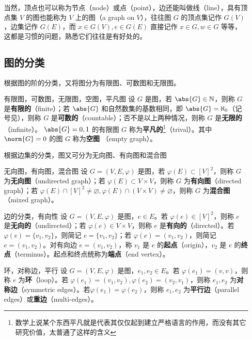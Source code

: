 当然，顶点也可以称为节点（node）或点（point），边还能叫做线（line），具有顶点集 $V$ 的图也能称为 $V$ 上的图（a graph on $V$），往往图 $G$ 的顶点集记作 $G(V)$，边集记作 $G(E)$，而 $x\in G(V),e\in G(E)$ 直接记作 $x\in G,w\in G$ 等等，这都是习惯的问题，熟悉它们往往是有好处的。


\subsection{图的分类}
根据图的阶的分类，又将图分为有限图、可数图和无限图。
\begin{definition}{有限图，可数图，无限图，空图，平凡图}
设 $G$ 是图，若 $\abs{G}\in\mathbb N$，则称 $G$ 是\textbf{有限的}（finite）；若 $\abs{G}$ 和自然数集的基数相同，即 $\abs{G}=\aleph_0$（记号见），则称 $G$ 是\textbf{可数的}（countable）；否不是以上两种情况，则称 $G$ 是\textbf{无限的}（infinite）。 $\abs{G}=0,1$ 的有限图 $G$ 称为\textbf{平凡的}\footnote{数学上说某个东西平凡就是代表其仅仅起到建立严格语言的作用，而没有其它研究价值，太普通了这样的含义}（trival）。其中 $\norm{G}=0$ 的图 $G$ 称为\textbf{空图} （empty graph）。 
\end{definition}

根据边集的分类，图又可分为无向图、有向图和混合图
\begin{definition}{无向图，有向图，混合图}
设 $G=(V,E,\varphi)$ 是图，若 $\varphi(E)\subset[V]^2$，则称 $G$ 为\textbf{无向图}（undirected graph）；若 $\varphi(E)\subset V\times V$，则称 $G$ 为\textbf{有向图}（directed graph）；若 $\varphi(E)\cap[V]^2\neq\varnothing,\varphi(E)\cap (V\times V)\neq\varnothing$，则称 $G$ 为\textbf{混合图}（mixed graph）。
\end{definition}

\begin{definition}{边的分类，有向性}
设 $G=(V,E,\varphi)$ 是图，$e\in E$。若 $\varphi(e)\in[V]^2$，则称 $e$ 是\textbf{无向的}（undirected）；若 $\varphi(e)\in V\times V$，则称 $e$ 是\textbf{有向的}（directed）。若 $\varphi(e)=\{v_1,v_2\}$，则简记 $e=\{v_1,v_2\}$；若 $\varphi(e)=(v_1,v_2)$，则简记 $e=(v_1,v_2)$。对有向边 $e=(v_1,v_2)$，称 $v_1$ 是 $e$ 的\textbf{起点}（origin），$v_2$ 是 $e$ 的\textbf{终点}（terminus）。起点和终点统称为\textbf{端点}（end vertex）。
\end{definition}

\begin{definition}{环，对称边，平行}
设 $G=(V,E,\varphi)$ 是图，$e_1,e_2\in E$。若 $\varphi(e_1)=(v,v)$，则称 $e$ 为\textbf{环}（loop）。若 $\varphi(e_1)=(v_1,v_2),\varphi(e_2)=(v_2,v_1)$，则称 $e_1,e_2$ 为\textbf{对称边}（symmetric edges）。若$\varphi(e_1)=\varphi(e_2)$，则称 $e_1,e_2$ 为\textbf{平行边}（parallel edges）或\textbf{重边}（multi-edges）。
\end{definition}


